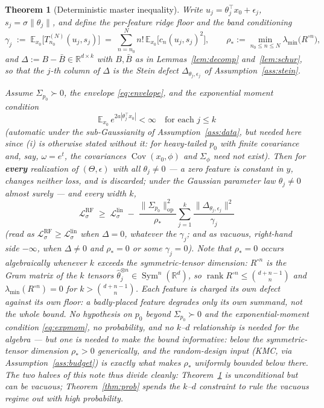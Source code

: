 \documentclass[11pt]{article}
\newtheorem{theorem}{Theorem}
\theoremstyle{remark}
\newcommand{\E}{\mathbb{E}}
\newcommand{\R}{\mathbb{R}}
\newcommand{\Cov}{\operatorname{Cov}}
\newcommand{\Sig}{\Sigma_{p_0}}
\newcommand{\lmin}{\lambda_{\min}}
\newcommand{\op}[1]{\lVert #1 \rVert_{\mathrm{op}}}
\begin{document}
\begin{theorem}[Deterministic master inequality]\label{thm:master}
Write $u_j = \theta_j^\top x_0 + \epsilon_j$, $s_j = \sigma\lVert\theta_j\rVert$, and define the \emph{per-feature ridge floor} and the band conditioning
\[
\gamma_j \;:=\; \E_{x_0}\big[T^{(N)}_{n_0}(u_j, s_j)\big] \;=\; \sum_{n=n_0}^{N} n!\,\E_{x_0}\big[c_n(u_j,s_j)^2\big],
\qquad
\rho_* := \min_{n_0 \le n \le N}\lmin\!\big(R^{\circ n}\big),
\]
and $\Delta := B - \bar B \in \R^{d\times k}$ with $B, \bar B$ as in Lemmas~\ref{lem:decomp} and~\ref{lem:schur}, so that the $j$-th column of $\Delta$ is the Stein defect $\Delta_{\theta_j,\epsilon_j}$ of Assumption~\ref{ass:stein}.

\noindent Assume $\Sig \succ 0$, the envelope \eqref{eq:envelope}, and the exponential moment condition
\begin{equation}\label{eq:expmom}
\E_{x_0}\, e^{2a|\theta_j^\top x_0|} < \infty \quad \text{for each } j \le k
\end{equation}
(automatic under the sub-Gaussianity of Assumption~\ref{ass:data}, but needed here since (i) is otherwise stated without it: for heavy-tailed $p_0$ with finite covariance and, say, $\omega = e^t$, the covariances $\Cov(x_0,\phi)$ and $\Sigma_\phi$ need not exist). Then for \textbf{every} realization of $(\Theta,\epsilon)$ with all $\theta_j \ne 0$ --- a zero feature is constant in $y$, changes neither loss, and is discarded; under the Gaussian parameter law $\theta_j \ne 0$ almost surely --- and every width $k$,
\[
\boxed{\ \ \mathcal L^{\mathrm{RF}}_\sigma \;\ge\; \mathcal L^{\mathrm{lin}}_\sigma \;-\; \frac{\op{\Sig}^{2}}{\rho_*}\sum_{j=1}^{k} \frac{\big\lVert\Delta_{\theta_j,\epsilon_j}\big\rVert^{2}}{\gamma_j}\ \ }
\]
(read as $\mathcal L^{\mathrm{RF}}_\sigma \ge \mathcal L^{\mathrm{lin}}_\sigma$ when $\Delta = 0$, whatever the $\gamma_j$; and as \emph{vacuous}, right-hand side $-\infty$, when $\Delta \ne 0$ and $\rho_* = 0$ or some $\gamma_j = 0$). Note that $\rho_* = 0$ occurs \emph{algebraically} whenever $k$ exceeds the symmetric-tensor dimension: $R^{\circ n}$ is the Gram matrix of the $k$ tensors $\hat\theta_j^{\otimes n} \in \operatorname{Sym}^n(\R^d)$, so $\operatorname{rank} R^{\circ n} \le \binom{d+n-1}{n}$ and $\lmin(R^{\circ n}) = 0$ for $k > \binom{d+n-1}{n}$. Each feature is charged its \emph{own} defect against its \emph{own} floor: a badly-placed feature degrades only its own summand, not the whole bound. No hypothesis on $p_0$ beyond $\Sig \succ 0$ and the exponential-moment condition \eqref{eq:expmom}, no probability, and no $k$--$d$ relationship is needed \emph{for the algebra} --- but one is needed to make the bound informative: below the symmetric-tensor dimension $\rho_* > 0$ generically, and the random-design input (KMC, via Assumption~\ref{ass:budget}) is exactly what makes $\rho_*$ uniformly bounded below there. The two halves of this note thus divide cleanly: Theorem~\ref{thm:master} is unconditional but can be vacuous; Theorem~\ref{thm:prob} spends the $k$--$d$ constraint to rule the vacuous regime out with high probability.

\end{theorem}
\end{document}
